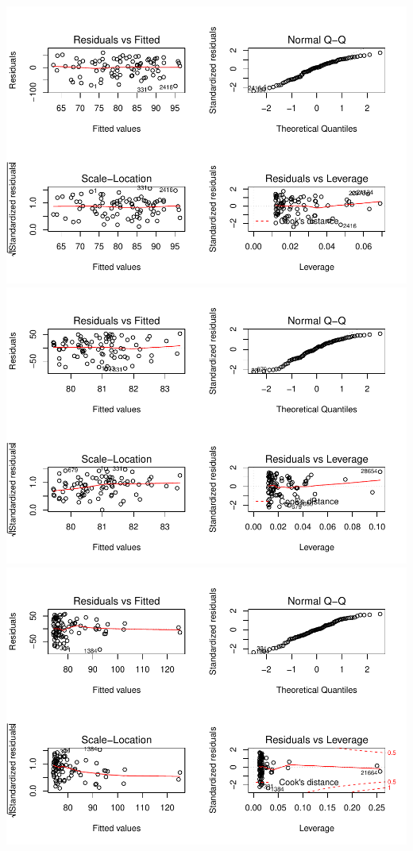 \documentclass[]{article}
\begin{document}
\includegraphics{Desc_stats_files/figure-latex/unnamed-chunk-1-1.pdf}
\includegraphics{Desc_stats_files/figure-latex/unnamed-chunk-1-2.pdf}
\includegraphics{Desc_stats_files/figure-latex/unnamed-chunk-1-3.pdf}
\end{document}
